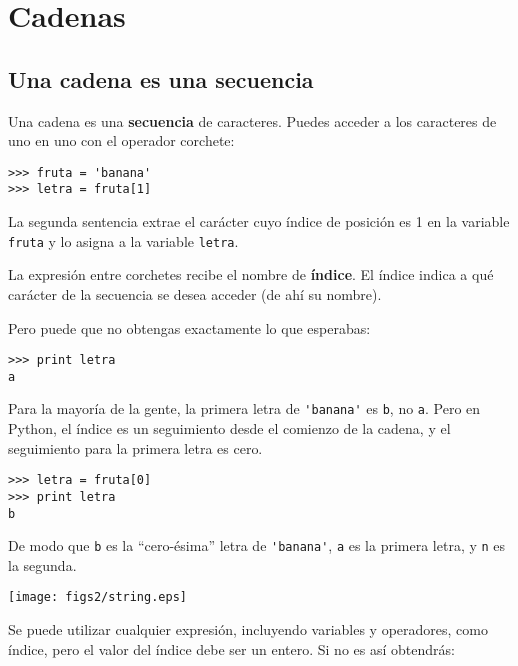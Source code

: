 
\chapter{Cadenas}
\label{strings}


\section{Una cadena es una secuencia}

Una cadena es una {\bf secuencia} de caracteres.
Puedes acceder a los caracteres de uno en uno con el
operador corchete:

\beforeverb
\begin{verbatim}
>>> fruta = 'banana'
>>> letra = fruta[1]
\end{verbatim}
\afterverb
%
La segunda sentencia extrae el carácter cuyo índice de posición es 1 en la
variable {\tt fruta} y lo asigna a la variable {\tt letra}.

La expresión entre corchetes recibe el nombre de {\bf índice}.
El índice indica a qué carácter de la secuencia se
desea acceder (de ahí su nombre).

Pero puede que no obtengas exactamente lo que esperabas:

\beforeverb
\begin{verbatim}
>>> print letra
a
\end{verbatim}
\afterverb
%
Para la mayoría de la gente, la primera letra de \verb"'banana'" es {\tt b}, no
{\tt a}. Pero en Python, el índice es un seguimiento desde el
comienzo de la cadena, y el seguimiento para la primera letra es cero.

\beforeverb
\begin{verbatim}
>>> letra = fruta[0]
>>> print letra
b
\end{verbatim}
\afterverb
%
De modo que {\tt b} es la ``cero-ésima'' letra de \verb"'banana'", {\tt a}
es la primera letra, y {\tt n} es la segunda.

\beforefig
\centerline{\texttt{[image: figs2/string.eps]}}
\afterfig


Se puede utilizar cualquier expresión, incluyendo variables y operadores, como índice,
pero el valor del índice debe ser un entero. Si no es así
obtendrás:

